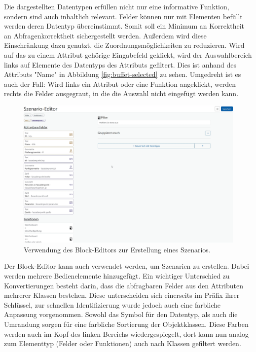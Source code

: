 Die dargestellten Datentypen erfüllen nicht nur eine informative Funktion, sondern sind auch inhaltlich relevant. Felder können nur mit Elementen befüllt werden deren Datentyp übereinstimmt. Somit soll ein Minimum an Korrektheit an Abfragenkorrektheit sichergestellt werden. Außerdem wird diese Einschränkung dazu genutzt, die Zuordnungsmöglichkeiten zu reduzieren. Wird auf das zu einem Attribut gehörige Eingabefeld geklickt, wird der Auswahlbereich links auf Elemente des Datentyps des Attributs gefiltert. Dies ist anhand des Attributs "Name" in Abbildung \ref{fig:buffet-selected} zu sehen. Umgedreht ist es auch der Fall: Wird links ein Attribut oder eine Funktion angeklickt, werden rechts die Felder ausgegraut, in die die Auswahl nicht eingefügt werden kann. 

\begin{figure}[ht]
  \begin{center}
    \includegraphics[width=.95\textwidth]{assets/buffet-scenario.png}
  \end{center}
  \caption{Verwendung des Block-Editors zur Erstellung eines Szenarios. }
  \label{fig:buffet-scenario}
\end{figure}

Der Block-Editor kann auch verwendet werden, um Szenarien zu erstellen. Dabei werden mehrere Bedienelemente hinzugefügt. Ein wichtiger Unterschied zu Konvertierungen besteht darin, dass die abfragbaren Felder aus den Attributen mehrerer Klassen bestehen. Diese unterscheiden sich einerseits im Präfix ihrer Schlüssel, zur schnellen Identifizierung wurde jedoch auch eine farbliche Anpassung vorgenommen. Sowohl das Symbol für den Datentyp, als auch die Umrandung sorgen für eine farbliche Sortierung der Objektklassen. Diese Farben werden auch im Kopf des linken Bereichs wiedergespiegelt, dort kann nun analog zum Elementtyp (Felder oder Funktionen) auch nach Klassen gefiltert werden. 

